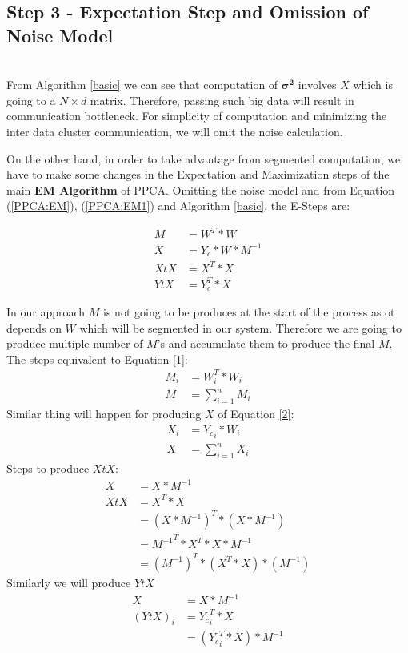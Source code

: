 \documentclass[12pt,notitlepage,oneside]{report}
\begin{document}
\subsection{\textbf{Step 3 - Expectation Step and Omission of Noise Model}}\hspace*{\fill} \\
From Algorithm \ref{basic} we can see that computation of $\pmb{\sigma ^2}$ involves $X$ which is going to a $N \times d$ matrix. Therefore, passing such big data will result in communication bottleneck. For simplicity of computation and minimizing the inter data cluster communication, we will omit the noise calculation. 

On the other hand, in order to take advantage from segmented computation, we have to make some changes in the Expectation and Maximization steps of the main \textbf{EM Algorithm} of PPCA. 
Omitting the noise model and from Equation (\ref{PPCA:EM}), (\ref{PPCA:EM1}) and Algorithm \ref{basic}, the E-Steps are:

\begin{align}
\label{1}
M &= W^T * W\\
\label{2}
X &= Y_c * W * M^{-1}\\
\label{3}
XtX &= X^T * X\\
\label{4}
YtX &= Y_c^T * X
\end{align}

In our approach $M$ is not going to be produces at the start of the process as ot depends on $W$ which will be segmented in our system. Therefore we are going to produce multiple number of $M$'s and accumulate them to produce the final $M$. The steps equivalent to Equation \ref{1}: 
\begin{align}
\label{5}
M_i &= W_i^T * W_i \\
\label{6}
M &= \sum^n_{i = 1} M_i
\end{align}
Similar thing will happen for producing $X$ of Equation \ref{2}:
\begin{align}
\label{7}
X_i &= {Y_c}_i * W_i\\
\label{8}
X &= \sum^n_{i = 1} X_i
\end{align}
Steps to produce $XtX$:
\begin{align*}
    X   &= X * M^{-1}\\
    XtX &= X^T * X\\
        &= (X * M^{-1})^T*(X * M^{-1})\\
        &= {M^{-1}}^T*X^T*X*M^{-1}\\
        &= {(M^{-1})}^T*(X^T*X)*(M^{-1})
\end{align*}
Similarly we will produce $YtX$
\begin{align*}
    X   &= X * M^{-1}\\
    (YtX)_i &= {Y_c}_i^T * X\\
        &= ({Y_c}_i^T * X) * M^{-1} 
\end{align*}
\end{document}
